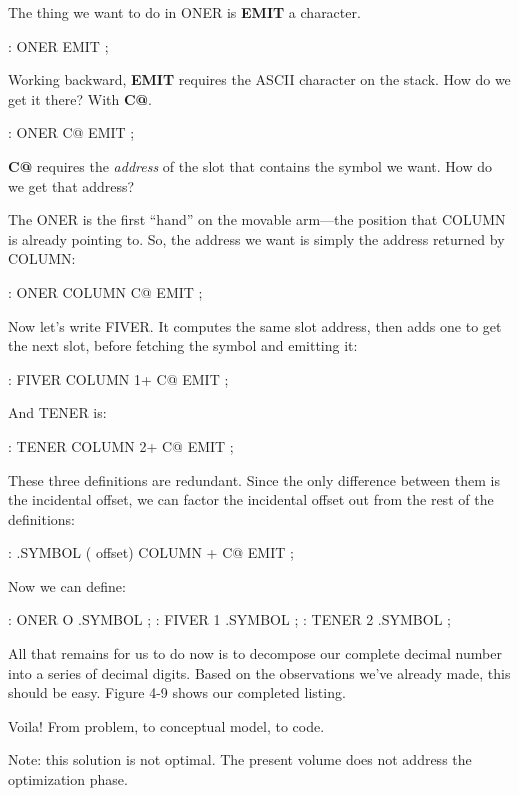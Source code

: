 The thing we want to do in ONER is \textbf{EMIT} a character.

\begin{Code}
: ONER                   EMIT ;
\end{Code}
Working backward, \textbf{EMIT} requires the ASCII character on the stack.
How do we get it there? With \textbf{C@}.

\begin{Code}
: ONER                C@ EMIT ;
\end{Code}
\textbf{C@} requires the \emph{address} of the slot that contains the symbol we
want. How do we get that address?

The ONER is the first ``hand'' on the movable arm---the position
that COLUMN is already pointing to. So, the address we want is simply
the address returned by COLUMN:

\begin{Code}
: ONER   COLUMN       C@ EMIT ;
\end{Code}
Now let's write FIVER. It computes the same slot address, then adds
one to get the next slot, before fetching the symbol and emitting it:

\begin{Code}
: FIVER  COLUMN 1+    C@ EMIT ;
\end{Code}
And TENER is:

\begin{Code}
: TENER  COLUMN 2+    C@ EMIT ;
\end{Code}
These three definitions are redundant. Since the only difference between
them is the incidental offset, we can factor the incidental offset out from
the rest of the definitions:

\begin{Code}
: .SYMBOL  ( offset)  COLUMN +  C@ EMIT ;
\end{Code}
Now we can define:

\begin{Code}
: ONER    O .SYMBOL ;
: FIVER   1 .SYMBOL ;
: TENER   2 .SYMBOL ;
\end{Code}
All that remains for us to do now is to decompose our complete decimal
number into a series of decimal digits. Based on the observations we've
already made, this should be easy. Figure 4-9 shows our completed
listing.

Voila! From problem, to conceptual model, to code.

Note: this solution is not optimal. The present volume does not address
the optimization phase.


